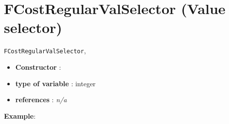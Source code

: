 \section{FCostRegularValSelector (Value selector)}\label{fcostregularvalselector:fcostregularvalselectorvalselector}\hypertarget{fcostregularvalselector:fcostregularvalselectorvalselector}{}
\begin{notedef}
  \texttt{FCostRegularValSelector}, 
\end{notedef}

\begin{itemize}
	\item \textbf{Constructor} : 
	\item \textbf{type of variable} : integer
	\item \textbf{references} : \emph{n/a}
\end{itemize}

\textbf{Example}:
%

